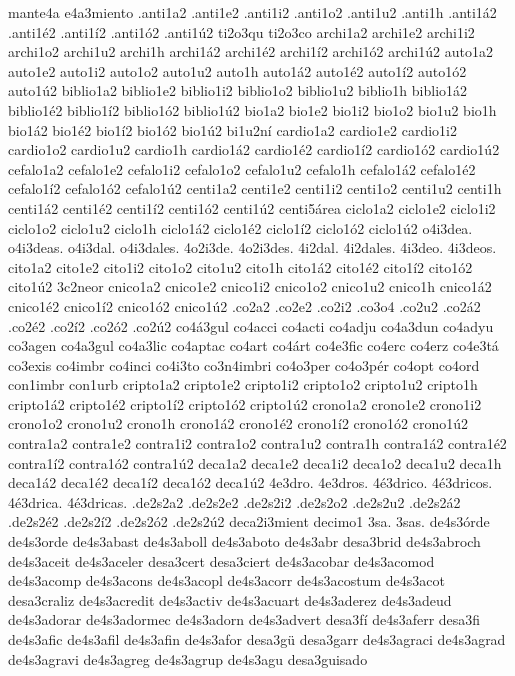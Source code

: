 {mante4a
e4a3miento
.anti1a2 .anti1e2 .anti1i2 .anti1o2 .anti1u2 .anti1h
.anti1á2 .anti1é2 .anti1í2 .anti1ó2 .anti1ú2
ti2o3qu ti2o3co
archi1a2 archi1e2 archi1i2 archi1o2 archi1u2 archi1h
archi1á2 archi1é2 archi1í2 archi1ó2 archi1ú2
auto1a2 auto1e2 auto1i2 auto1o2 auto1u2 auto1h
auto1á2 auto1é2 auto1í2 auto1ó2 auto1ú2
biblio1a2 biblio1e2 biblio1i2 biblio1o2 biblio1u2 biblio1h
biblio1á2 biblio1é2 biblio1í2 biblio1ó2 biblio1ú2
bio1a2 bio1e2 bio1i2 bio1o2 bio1u2 bio1h
bio1á2 bio1é2 bio1í2 bio1ó2 bio1ú2
bi1u2ní
cardio1a2 cardio1e2 cardio1i2 cardio1o2 cardio1u2 cardio1h
cardio1á2 cardio1é2 cardio1í2 cardio1ó2 cardio1ú2
cefalo1a2 cefalo1e2 cefalo1i2 cefalo1o2 cefalo1u2 cefalo1h
cefalo1á2 cefalo1é2 cefalo1í2 cefalo1ó2 cefalo1ú2
centi1a2 centi1e2 centi1i2 centi1o2 centi1u2 centi1h
centi1á2 centi1é2 centi1í2 centi1ó2 centi1ú2
centi5área
ciclo1a2 ciclo1e2 ciclo1i2 ciclo1o2 ciclo1u2 ciclo1h
ciclo1á2 ciclo1é2 ciclo1í2 ciclo1ó2 ciclo1ú2
o4i3dea. o4i3deas. o4i3dal. o4i3dales.
4o2i3de. 4o2i3des. 4i2dal. 4i2dales.
4i3deo. 4i3deos.
cito1a2 cito1e2 cito1i2 cito1o2 cito1u2 cito1h
cito1á2 cito1é2 cito1í2 cito1ó2 cito1ú2
3c2neor
cnico1a2 cnico1e2 cnico1i2 cnico1o2 cnico1u2 cnico1h
cnico1á2 cnico1é2 cnico1í2 cnico1ó2 cnico1ú2
.co2a2 .co2e2 .co2i2 .co3o4 .co2u2 .co2á2 .co2é2 .co2í2 .co2ó2 .co2ú2
co4á3gul
co4acci
co4acti
co4adju
co4a3dun
co4adyu
co3agen
co4a3gul
co4a3lic
co4aptac
co4art
co4árt
co4e3fic
co4erc
co4erz
co4e3tá
co3exis
co4imbr
co4inci
co4i3to
co3n4imbri
co4o3per
co4o3pér
co4opt
co4ord
con1imbr
con1urb
cripto1a2 cripto1e2 cripto1i2 cripto1o2 cripto1u2 cripto1h
cripto1á2 cripto1é2 cripto1í2 cripto1ó2 cripto1ú2
crono1a2 crono1e2 crono1i2 crono1o2 crono1u2 crono1h
crono1á2 crono1é2 crono1í2 crono1ó2 crono1ú2
contra1a2 contra1e2 contra1i2 contra1o2 contra1u2 contra1h
contra1á2 contra1é2 contra1í2 contra1ó2 contra1ú2
deca1a2 deca1e2 deca1i2 deca1o2 deca1u2 deca1h
deca1á2 deca1é2 deca1í2 deca1ó2 deca1ú2
4e3dro. 4e3dros. 4é3drico. 4é3dricos. 4é3drica.
4é3dricas.
.de2s2a2 .de2s2e2 .de2s2i2 .de2s2o2 .de2s2u2 
.de2s2á2 .de2s2é2 .de2s2í2 .de2s2ó2 .de2s2ú2
deca2i3mient
decimo1
3sa. 3sas.
de4s3órde
de4s3orde
de4s3abast
de4s3aboll
de4s3aboto
de4s3abr
desa3brid
de4s3abroch
de4s3aceit
de4s3aceler
desa3cert
desa3ciert
de4s3acobar
de4s3acomod
de4s3acomp
de4s3acons
de4s3acopl
de4s3acorr
de4s3acostum
de4s3acot
desa3craliz
de4s3acredit
de4s3activ
de4s3acuart
de4s3aderez
de4s3adeud
de4s3adorar
de4s3adormec
de4s3adorn
de4s3advert
desa3fí
de4s3aferr
desa3fi
de4s3afic
de4s3afil
de4s3afin
de4s3afor
desa3gü
desa3garr
de4s3agraci
de4s3agrad
de4s3agravi
de4s3agreg
de4s3agrup
de4s3agu
desa3guisado
}
